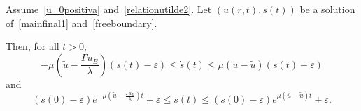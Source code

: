 \documentclass[10pt,a4paper]{amsart}
\renewcommand{\leq}{\leqslant}
\begin{document}
\begin{lemma}\label{lemmastimespunto}
Assume~\eqref{u_0positiva} and~\eqref{relationutilde2}.
Let $(u(r,t), s(t))$ be a solution of~\eqref{mainfinal1} and~\eqref{freeboundary}.

Then, for all $t>0$,
\begin{equation}\label{stimespunto}
-\mu\left(\widetilde u-\frac{\Gamma u_B}{\lambda}\right)(s(t)-\varepsilon)\leq \dot s(t)\leq \mu(\overline{u}-\widetilde u)(s(t)-\varepsilon)
\end{equation}
and
\begin{equation}\label{stimespunto2}
(s(0)-\varepsilon)e^{-\mu\left(\widetilde u-\frac{\Gamma u_B}{\lambda}\right)t} +\varepsilon\leq s(t)\leq (s(0)-\varepsilon)e^{\mu(\overline{u}-\widetilde u) t}+\varepsilon .
\end{equation}
\end{lemma}
\end{document}
